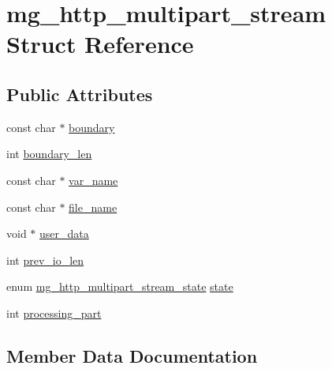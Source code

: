 \hypertarget{structmg__http__multipart__stream}{}\section{mg\+\_\+http\+\_\+multipart\+\_\+stream Struct Reference}
\label{structmg__http__multipart__stream}
\subsection*{Public Attributes}
\begin{DoxyCompactItemize}
\item 
const char $\ast$ \hyperlink{structmg__http__multipart__stream_a3d11ab1b3c615d48ea25bb3bf8e9f177_a3d11ab1b3c615d48ea25bb3bf8e9f177}{boundary}
\item 
int \hyperlink{structmg__http__multipart__stream_a80ee5d864783ca07c0a1f05fd4622a4d_a80ee5d864783ca07c0a1f05fd4622a4d}{boundary\+\_\+len}
\item 
const char $\ast$ \hyperlink{structmg__http__multipart__stream_a4fd8fc13c41018970fc693e67c785581_a4fd8fc13c41018970fc693e67c785581}{var\+\_\+name}
\item 
const char $\ast$ \hyperlink{structmg__http__multipart__stream_a5738270f2832102f935276c85c86e427_a5738270f2832102f935276c85c86e427}{file\+\_\+name}
\item 
void $\ast$ \hyperlink{structmg__http__multipart__stream_afbd0589be4b387576e5780a31b74c3a7_afbd0589be4b387576e5780a31b74c3a7}{user\+\_\+data}
\item 
int \hyperlink{structmg__http__multipart__stream_a283091a42c25b39fc89874e0180efa29_a283091a42c25b39fc89874e0180efa29}{prev\+\_\+io\+\_\+len}
\item 
enum \hyperlink{mongoose_8c_a05bd495cf42be60db36810ae0b9f4d34_a05bd495cf42be60db36810ae0b9f4d34}{mg\+\_\+http\+\_\+multipart\+\_\+stream\+\_\+state} \hyperlink{structmg__http__multipart__stream_a2f0a90e902fb206b20b207fc691e1748_a2f0a90e902fb206b20b207fc691e1748}{state}
\item 
int \hyperlink{structmg__http__multipart__stream_ac0f7c41900e3cdfe92b21ef5608780dc_ac0f7c41900e3cdfe92b21ef5608780dc}{processing\+\_\+part}
\end{DoxyCompactItemize}


\subsection{Member Data Documentation}
\mbox{\label{structmg__http__multipart__stream_a3d11ab1b3c615d48ea25bb3bf8e9f177_a3d11ab1b3c615d48ea25bb3bf8e9f177}} 
